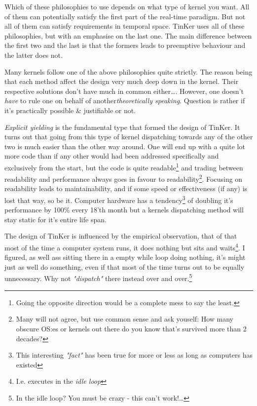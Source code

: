 Which of these philosophies to use depends on what type of kernel you want. All of them can potentially satisfy the first part of the real-time paradigm. But not all of them can satisfy requirements in temporal space. TinKer uses all of these philosophies, but with an emphasise on the last one. The main difference between the first two and the last is that the formers leads to preemptive behaviour and the latter does not. 

Many kernels follow one of the above philosophies quite strictly. The reason being that each method affect the design very much deep down in the kernel. Their respective solutions don't have much in common either\ldots. However, one doesn't \textit{have} to rule one on behalf of another\textit{theoretically speaking}. Question is rather if it's practically possible \& justifiable or not. 

\textit{Explicit yielding} is the fundamental type that formed the design of TinKer. It turns out that going from this type of kernel dispatching towards any of the other two is much easier than the other way around. One will end up with a quite lot more code than if any other would had been addressed specifically and exclusively from the start, but the code is quite readable\footnote{Going the opposite direction would be a complete mess to say the least.} and trading between readability and performance always goes in favour to readability\footnote{Many will not agree, but use common sense and ask youself: How many obscure OS:es or kernels out there do you know that's survived more than 2 decades?}. Focusing on readability leads to maintainability, and if some speed or effectiveness (if any) is lost that way, so be it. Computer hardware has a tendency\footnote{This interesting \textit{"fact"} has been true for more or less as long as computers has existed} of doubling it's performance by 100\%  every 18'th month but a kernels dispatching method will stay static for it's entire life span.

The design of TinKer is influenced by the  empirical observation, that of that most of the time a computer system runs, it does nothing but sits and waits\footnote{I.e. executes in the \textit{idle loop}}. I figured, as well ass sitting there in a empty while loop doing nothing, it's might just as well do something, even if that most of the time turns out to be equally unnecessary. Why not \textit{"dispatch"} there instead over and over.\footnote{In the idle loop? You must be crazy - this can't work!\ldots}

